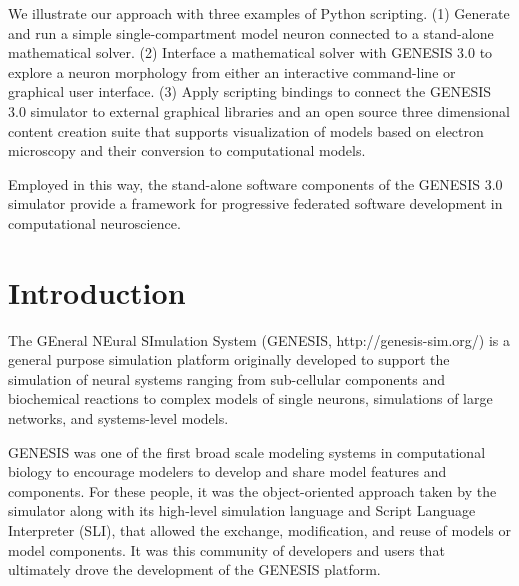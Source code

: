 \documentclass[10pt]{article}
\begin{document}
We illustrate our approach with three examples of Python scripting. 
(1) Generate and run a simple single-compartment model neuron connected to a 
stand-alone mathematical solver. (2) Interface a mathematical solver with GENESIS 3.0 to explore a neuron morphology from either
an interactive command-line or graphical user interface.
(3) Apply scripting bindings to connect the GENESIS 3.0 simulator to
external graphical libraries and an open source three dimensional content creation
suite that supports visualization of models based on electron
microscopy and their conversion to computational
models.

Employed in this way, the stand-alone software components of the GENESIS 3.0 
simulator provide a framework for progressive federated
software development in computational neuroscience.


\section*{\LARGE Introduction}

The GEneral NEural SImulation System (GENESIS,
http://genesis-sim.org/) is a general purpose simulation platform originally
developed to support the simulation of neural systems ranging from
sub-cellular components and biochemical reactions to complex models of
single neurons, simulations of large networks, and systems-level
models.

GENESIS was one of the first broad scale modeling systems in
computational biology to encourage modelers to develop and share model
features and components. For these people, it was the object-oriented
approach taken by the simulator along with its high-level simulation
language and Script Language Interpreter (SLI), that allowed the exchange, modification, and reuse of models
or model components.  It was this community of developers and
 users that ultimately drove the development of the GENESIS platform.
 
\end{document}
